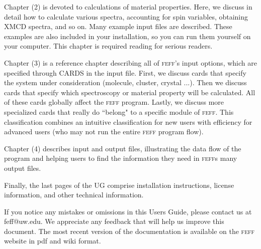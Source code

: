 \documentclass[11pt,oneside]{report} %
\renewcommand{\htmlref}[2]{\hyperlink{#2}{#1}}
\newcommand{\program}[1]{\textsc{#1}}
\newcommand{\feff}{\program{feff}}
\renewcommand{\htmlref}[2]{{#1}} %
\begin{document}
\begin{latexonly}
Chapter (2) is devoted to \htmlref{calculations of material properties}{sec:Calc-Strat-Exampl}.  Here, we discuss in detail how to calculate various spectra, accounting for spin variables, obtaining XMCD spectra, and so on.  Many example input files are described.  
These examples are also included in your 
 installation, so you can run them yourself on your computer.  This chapter is required reading for serious readers.

Chapter (3) is a reference chapter describing all of \htmlref{{\feff}'s input options}{sec:Input-Control-Cards}, which are specified through CARDS in the input file.
First, we discuss cards that specify the
system under consideration (molecule, cluster, crystal ...).  Then we discuss cards that specify which spectroscopy or material property will be calculated.  All of these cards globally affect the
{\feff} program.  Lastly, we discuss more specialized cards that really do ``belong" to a specific module of {\feff}.  This classification combines an intuitive classification for new users with efficiency for advanced users (who may not run the entire {\feff} program flow).

Chapter (4) describes \htmlref{input and output files}{sec:Input-and-Output-Files}, illustrating the data flow of the program and helping users to find the information they need in {\feff}s many output files.

Finally, the last pages of the UG comprise \htmlref{installation instructions}{sec:Append-B-Inst}, license information, and other technical information.

If you notice any mistakes or omissions in this Users Guide, please contact us at \htmlref{feff@uw.edu}{mailto:feff@uw.edu}.  We appreciate any feedback that will help us improve this document.  The most recent version of the documentation is available on the \htmlref{{\feff} website} {http://www.feffgroup.org} in pdf and wiki format.





\end{latexonly}
\end{document}
